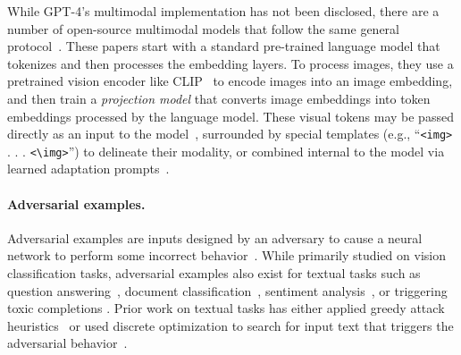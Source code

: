 \documentclass{article}
\renewcommand{\cite}{\citep}
\begin{document}
While GPT-4's  multimodal implementation has not been disclosed,
there are a number of open-source multimodal models
that follow the same general protocol~\cite{gao2023llama,llava,minigpt4}.
%
These papers start with a standard pre-trained language model that tokenizes and then processes the embedding layers.
To process images, they use a pretrained vision encoder like CLIP~\cite{radford2021learning}
to encode images into an image embedding, and then 
train a \emph{projection model} that converts image embeddings
into token embeddings processed by the language model.  These visual tokens may be passed directly as an input to the model~\cite{minigpt4,llava}, surrounded by special templates (e.g., ``\verb`<img>` . . . \verb`<\img>`'') to delineate their modality, or combined internal to the model via learned adaptation prompts~\cite{gao2023llama}. 
%
%

%


\paragraph{Adversarial examples.}

Adversarial examples are inputs designed by an adversary to cause a neural network
to perform some incorrect behavior~\citep{szegedy2013intriguing, biggio2013evasion}.
%
While primarily studied on vision classification tasks, 
adversarial examples also exist for 
textual tasks such as
question answering~\citep{jia2017adversarial, wallace2019universal},
document classification~\cite{ebrahimi2017hotflip},
sentiment analysis~\cite{alzantot2018generating}, or triggering toxic completions
\cite{jones2023automatically, wallace2019universal}.
Prior work on textual tasks has either applied greedy attack heuristics~\cite{jia2017adversarial, alzantot2018generating}
or used discrete optimization to search for input text that triggers
the adversarial behavior~\cite{ebrahimi2017hotflip,wallace2019universal,jones2023automatically}.
\end{document}
